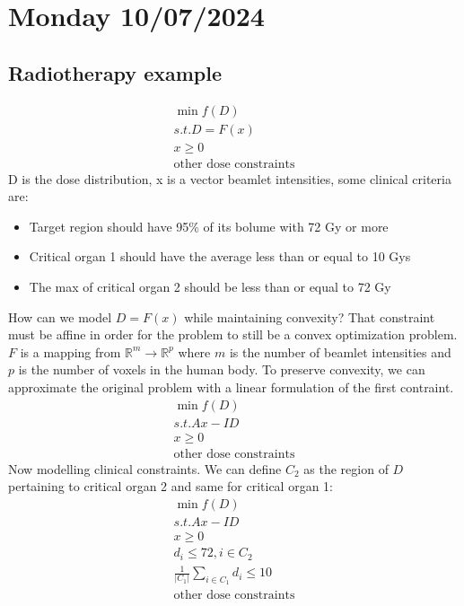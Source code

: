 \section{Monday 10/07/2024}
\subsection{Radiotherapy example}
\begin{equation}
  \begin{aligned}
    \min f(D) \\
    s.t. D = F(x) \\
    x \geq 0 \\
    \text{other dose constraints}
  \end{aligned}
\end{equation}
D is the dose distribution, x is a vector beamlet intensities, some clinical criteria are:
\begin{itemize}
  \item Target region should have 95\% of its bolume with 72 Gy or more
  \item Critical organ 1 should have the average less than or equal to 10 Gys
  \item The max of critical organ 2 should be less than or equal to 72 Gy
\end{itemize}
How can we model $D= F(x)$ while maintaining convexity? That constraint must be affine in order for the problem to still be a convex optimization problem. $F$ is a mapping from $\mathbb{R}^m \to \mathbb{R}^p$ where $m$ is the number of beamlet intensities and $p$ is the number of voxels in the human body. To preserve convexity, we can approximate the original problem with a linear formulation of the first contraint.
\begin{equation}
  \begin{aligned}
    \min f(D) \\
    s.t. Ax-ID \\
    x \geq 0 \\
    \text{other dose constraints}
  \end{aligned}
\end{equation}
Now modelling clinical constraints. We can define $C_2$ as the region of $D$ pertaining to critical organ 2 and same for critical organ 1:
\begin{equation}
  \begin{aligned}
    \min f(D) \\
    s.t. Ax-ID \\
    x \geq 0 \\
    d_i \leq 72, i \in C_2 \\
    \frac{1}{|C_1|}\sum_{i \in C_1} d_i \leq 10 \\
    \text{other dose constraints}
  \end{aligned}
\end{equation}

